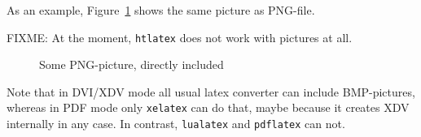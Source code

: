 As an example, Figure~\ref{fig:asIsPng} shows the same picture 
as PNG-file. 

FIXME\@: At the moment, \texttt{htlatex} does not work with pictures at all. 

\begin{figure}[htb]
\centering
{}
\caption{\label{fig:asIsPng}Some PNG-picture, directly included }
\end{figure}

Note that in DVI/XDV mode all usual latex converter 
can include BMP-pictures, whereas in PDF mode only \texttt{xelatex} 
can do that, maybe because it creates XDV internally in any case. 
In contrast, \texttt{lualatex} and \texttt{pdflatex} can not. 

  
